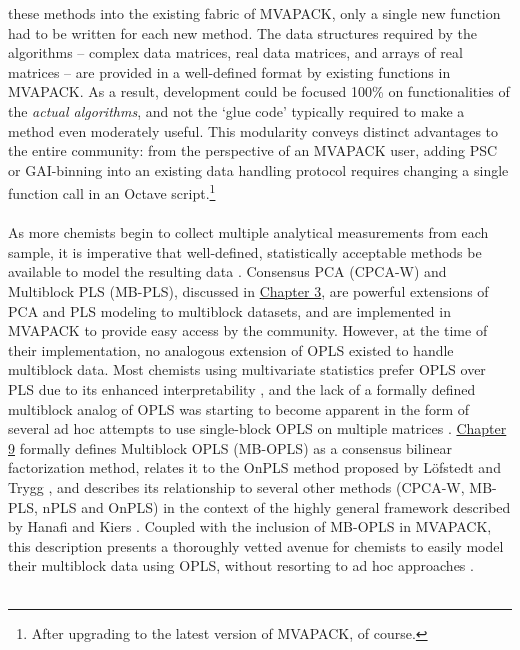 \begin{doublespace}
these methods into the existing fabric of MVAPACK, only a single new
function had to be written for each new method. The data structures
required by the algorithms -- complex data matrices, real data matrices,
and arrays of real matrices -- are provided in a well-defined format by
existing functions in MVAPACK. As a result, development could be focused
100\% on functionalities of the \emph{actual algorithms}, and not the
`glue code' typically required to make a method even moderately useful.
This modularity conveys distinct advantages to the entire community:
from the perspective of an MVAPACK user, adding PSC or GAI-binning into
an existing data handling protocol requires changing a single function
call in an Octave script.\footnote{After upgrading to the latest version
of MVAPACK, of course.}
\\\\
As more chemists begin to collect multiple analytical measurements from each
sample, it is imperative that well-defined, statistically acceptable methods
be available to model the resulting data \cite{westerhuis:jchemo1997,
  westerhuis:jchemo1998,smilde:jchemo2003,
  marshall:metab2015,worley:jchemo2015}. Consensus PCA (CPCA-W) and Multiblock
PLS (MB-PLS), discussed in \hyperlink{chapter.3}{Chapter 3}, are powerful
extensions of PCA and PLS modeling to multiblock datasets, and are implemented
in MVAPACK to provide easy access by the community. However, at the time of
their implementation, no analogous extension of OPLS existed to handle
multiblock data. Most chemists using multivariate statistics prefer OPLS
over PLS due to its enhanced
interpretability \cite{trygg:jchemo2002,tapp:trac2009}, and the lack of
a formally defined multiblock analog of OPLS was starting to become apparent
in the form of several ad hoc attempts to use single-block OPLS on multiple
matrices \cite{bylesjo:jpr2009,boccard:aca2013}.
\hyperlink{chapter.9}{Chapter 9} formally defines Multiblock OPLS (MB-OPLS)
as a consensus bilinear factorization method, relates it to the OnPLS method
proposed by L\"{o}fstedt and Trygg \cite{lofstedt:jchemo2011}, and describes
its relationship to several other methods (CPCA-W, MB-PLS, nPLS and OnPLS)
in the context of the highly general framework described by Hanafi and Kiers
\cite{hanafi:csda2006}. Coupled with the inclusion of MB-OPLS in MVAPACK,
this description presents a thoroughly vetted avenue for chemists to easily
model their multiblock data using OPLS, without resorting to ad hoc
approaches \cite{worley:jchemo2015}.
\\\\

\end{doublespace}

